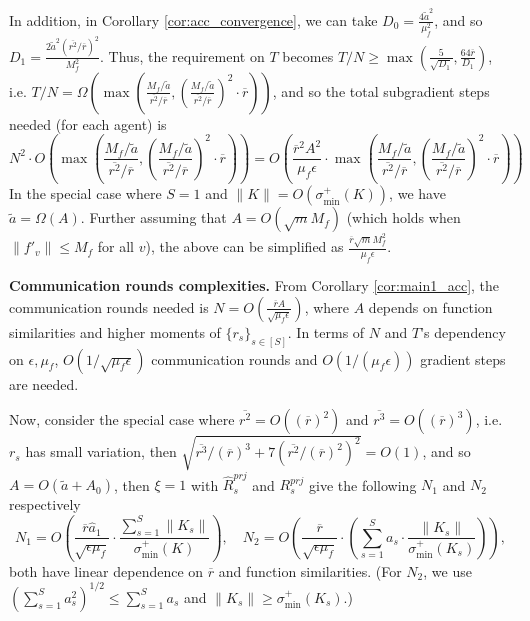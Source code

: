 \documentclass[10pt]{article}
\begin{document}
In addition, in Corollary \ref{cor:acc_convergence}, we can take $D_0 = \frac{4\widetilde{a}^2}{\mu_f^2}$, and so $D_1 = \frac{2\widetilde{a}^2(\overline{r^2}/\overline{r})^2}{M_f^2}$. Thus, the requirement on $T$ becomes $T/N\geq \max(\frac{5}{\sqrt{D_1}},\frac{64\overline{r}}{D_1})$, i.e. $T/N = \Omega(\max(\frac{M_f/\widetilde{a}}{\overline{r^2}/\overline{r}},(\frac{M_f/\widetilde{a}}{\overline{r^2}/\overline{r}})^2\cdot \overline{r}))$, and so the total subgradient steps needed (for each agent) is
\begin{displaymath}
    N^2\cdot O(\max(\frac{M_f/\widetilde{a}}{\overline{r^2}/\overline{r}},(\frac{M_f/\widetilde{a}}{\overline{r^2}/\overline{r}})^2\cdot \overline{r})) = O(\frac{\overline{r}^2A^2}{\mu_f \epsilon}\cdot \max(\frac{M_f/\widetilde{a}}{\overline{r^2}/\overline{r}},(\frac{M_f/\widetilde{a}}{\overline{r^2}/\overline{r}})^2\cdot \overline{r}))
\end{displaymath}
In the special case where $S = 1$ and $\|K\| = O(\sigma_{\min}^+(K))$, we have $\widetilde{a} = \Omega(A)$. Further assuming that $A = O(\sqrt{m}M_f)$ (which holds when $\|f'_v\|\leq M_f$ for all $v$), the above can be simplified as $\frac{\overline{r}\sqrt{m}M_f^2}{\mu_f \epsilon}$. 


\textbf{Communication rounds complexities.} From Corollary \ref{cor:main1_acc}, the communication rounds needed is $N = O(\frac{\overline{r}A}{\sqrt{\mu_f \epsilon}})$, where $A$ depends on function similarities and higher moments of $\{r_s\}_{s\in [S]}$. In terms of $N$ and $T$'s dependency on $\epsilon,\mu_f$, $O(1/\sqrt{\mu_f\epsilon})$ communication rounds and $O(1/(\mu_f\epsilon))$ gradient steps are needed. 




Now, consider the special case where $\overline{r^2}=O((\overline{r})^2)$ and $\overline{r^3}=O((\overline{r})^3)$, i.e. $r_s$ has small variation, then $\sqrt{\overline{r^3}/(\overline{r})^3 + 7(\overline{r^2}/(\overline{r})^2)^2} = O(1)$, and so $A = O(\widetilde{a} + A_0)$, then $\xi=1$ with $\widehat{R}_s^{prj}$ and $R_s^{prj}$ give the following $N_1$ and $N_2$ respectively 
\begin{displaymath}
     N_1 = O\left(\frac{\overline{r}\widehat{a}_1}{\sqrt{\epsilon\mu_f}}\cdot \frac{\sum_{s=1}^S \|K_s\|}{\sigma_{\min}^+(K)}\right),\quad N_2 = O\left(\frac{\overline{r}}{\sqrt{\epsilon\mu_f}}\cdot \left(\sum_{s=1}^S a_s \cdot \frac{ \|K_s\|}{\sigma_{\min}^+(K_s)}\right)\right),
\end{displaymath}
both have linear dependence on $\overline{r}$ and function similarities. (For $N_2$, we use $(\sum_{s=1}^S a_s^2)^{1/2} \leq \sum_{s=1}^S a_s$ and $\|K_s\|\geq \sigma_{\min}^+(K_s)$.)
\end{document}
